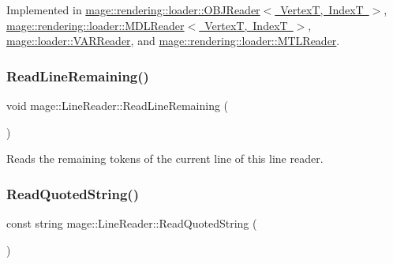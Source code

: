 Implemented in \mbox{\hyperlink{classmage_1_1rendering_1_1loader_1_1_o_b_j_reader_a6552753d2295585283df035732f38dbd}{mage\+::rendering\+::loader\+::\+O\+B\+J\+Reader$<$ Vertex\+T, Index\+T $>$}}, \mbox{\hyperlink{classmage_1_1rendering_1_1loader_1_1_m_d_l_reader_a121bfa0a48d01bdc37cf09b7f3a25a27}{mage\+::rendering\+::loader\+::\+M\+D\+L\+Reader$<$ Vertex\+T, Index\+T $>$}}, \mbox{\hyperlink{classmage_1_1loader_1_1_v_a_r_reader_a511a0778cc515aece781bfdb76024cea}{mage\+::loader\+::\+V\+A\+R\+Reader}}, and \mbox{\hyperlink{classmage_1_1rendering_1_1loader_1_1_m_t_l_reader_a54eb83757c915ebca73175e83737cf73}{mage\+::rendering\+::loader\+::\+M\+T\+L\+Reader}}.

\mbox{\label{classmage_1_1_line_reader_a3a4b99bfef1e8a826d74a01bcc663fcb}} 
\subsubsection{\texorpdfstring{Read\+Line\+Remaining()}{ReadLineRemaining()}}
{\footnotesize\ttfamily void mage\+::\+Line\+Reader\+::\+Read\+Line\+Remaining (\begin{DoxyParamCaption}{ }\end{DoxyParamCaption})\hspace{0.3cm}{\ttfamily [protected]}}

Reads the remaining tokens of the current line of this line reader. \mbox{\label{classmage_1_1_line_reader_ae9a7547d01b29c3237b198444d4f3aef}} 
\subsubsection{\texorpdfstring{Read\+Quoted\+String()}{ReadQuotedString()}}
{\footnotesize\ttfamily const string mage\+::\+Line\+Reader\+::\+Read\+Quoted\+String (\begin{DoxyParamCaption}{ }\end{DoxyParamCaption})\hspace{0.3cm}{\ttfamily [protected]}}

